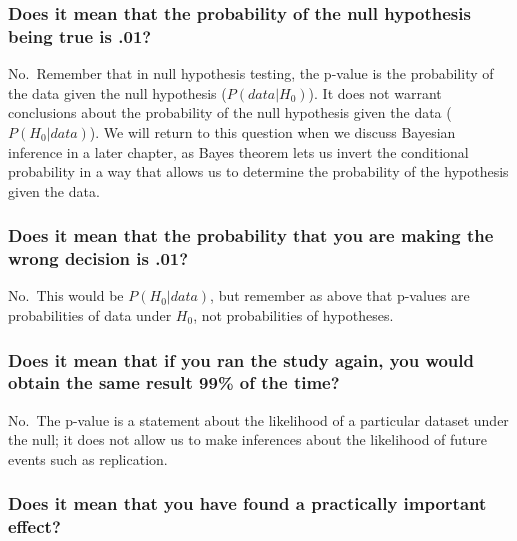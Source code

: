 \documentclass[
  12pt,
]{book}
\begin{document}
\hypertarget{does-it-mean-that-the-probability-of-the-null-hypothesis-being-true-is-.01}{%
\subsubsection{Does it mean that the probability of the null hypothesis being true is .01?}\label{does-it-mean-that-the-probability-of-the-null-hypothesis-being-true-is-.01}}

No.~Remember that in null hypothesis testing, the p-value is the probability of the data given the null hypothesis (\(P(data|H_0)\)). It does not warrant conclusions about the probability of the null hypothesis given the data (\(P(H_0|data)\)). We will return to this question when we discuss Bayesian inference in a later chapter, as Bayes theorem lets us invert the conditional probability in a way that allows us to determine the probability of the hypothesis given the data.

\hypertarget{does-it-mean-that-the-probability-that-you-are-making-the-wrong-decision-is-.01}{%
\subsubsection{Does it mean that the probability that you are making the wrong decision is .01?}\label{does-it-mean-that-the-probability-that-you-are-making-the-wrong-decision-is-.01}}

No.~This would be \(P(H_0|data)\), but remember as above that p-values are probabilities of data under \(H_0\), not probabilities of hypotheses.

\hypertarget{does-it-mean-that-if-you-ran-the-study-again-you-would-obtain-the-same-result-99-of-the-time}{%
\subsubsection{Does it mean that if you ran the study again, you would obtain the same result 99\% of the time?}\label{does-it-mean-that-if-you-ran-the-study-again-you-would-obtain-the-same-result-99-of-the-time}}

No.~The p-value is a statement about the likelihood of a particular dataset under the null; it does not allow us to make inferences about the likelihood of future events such as replication.

\hypertarget{does-it-mean-that-you-have-found-a-practically-important-effect}{%
\subsubsection{Does it mean that you have found a practically important effect?}\label{does-it-mean-that-you-have-found-a-practically-important-effect}}
\end{document}
